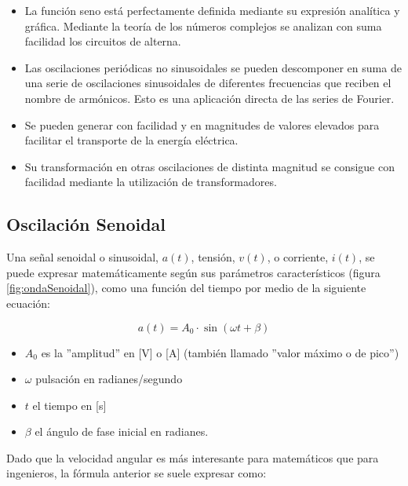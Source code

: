 \documentclass{article}
\begin{document}
\begin{itemize}
    \item La función seno está perfectamente definida mediante su expresión analítica y gráfica. Mediante la teoría de los números complejos se analizan con suma facilidad los circuitos de alterna.
    
    \item Las oscilaciones periódicas no sinusoidales se pueden descomponer en suma de una serie de oscilaciones sinusoidales de diferentes frecuencias que reciben el nombre de armónicos. Esto es una aplicación directa de las series de Fourier.
    
    \item Se pueden generar con facilidad y en magnitudes de valores elevados para facilitar el transporte de la energía eléctrica.
    
    \item Su transformación en otras oscilaciones de distinta magnitud se consigue con facilidad mediante la utilización de transformadores.
    
\end{itemize}

\subsection{Oscilación Senoidal}

Una señal senoidal o sinusoidal, $a(t)$, tensión, $v(t)$, o corriente, $i(t)$, se puede expresar matemáticamente según sus parámetros característicos (figura \ref{fig:ondaSenoidal}), como una función del tiempo por medio de la siguiente ecuación:\citep{CA}

\begin{equation}
    a(t)=A_0 \cdot \sin(\omega t + \beta)
\end{equation}
\begin{itemize}
    \item $A_0$ es la ''amplitud'' en [V] o [A] (también llamado ''valor máximo o de pico'')
    
    \item $\omega$  pulsación en radianes/segundo
    
    \item $t$ el tiempo en [s]
    
    \item $\beta$ el ángulo de fase inicial en radianes.
\end{itemize}


Dado que la velocidad angular es más interesante para matemáticos que para ingenieros, la fórmula anterior se suele expresar como:\citep{CA}\\
\end{document}
